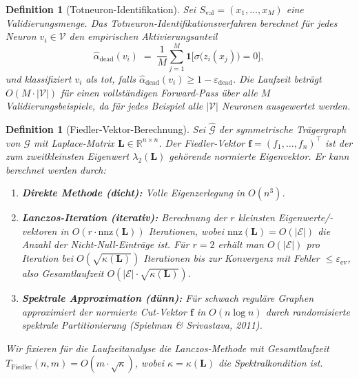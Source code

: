 \documentclass[12pt, a4paper, openany]{report}
\newtheorem{definition}[theorem]{Definition}
\newcommand{\R}{\mathbb{R}}
\newcommand{\calG}{\mathcal{G}}
\newcommand{\calV}{\mathcal{V}}
\newcommand{\calE}{\mathcal{E}}
\newcommand{\eps}{\varepsilon}
\begin{document}
\begin{definition}[Totneuron-Identifikation]
\label{def:dead_identification}
Sei $S_{\mathrm{val}} = (x_1, \ldots, x_M)$ eine Validierungsmenge.
Das \emph{Totneuron-Identifikationsverfahren} berechnet für jedes Neuron
$v_i \in \calV$ den empirischen Aktivierungsanteil
\begin{equation}
  \label{eq:dead_rate}
  \hat{\alpha}_{\mathrm{dead}}(v_i)
  \;=\;
  \frac{1}{M}\sum_{j=1}^{M}
  \mathbf{1}\!\bigl[\sigma\bigl(z_i(x_j)\bigr) = 0\bigr],
\end{equation}
und klassifiziert $v_i$ als tot, falls $\hat{\alpha}_{\mathrm{dead}}(v_i) \geq 1 - \eps_{\mathrm{dead}}$.
Die Laufzeit beträgt $O(M \cdot |\calV|)$ für einen vollständigen Forward-Pass
über alle $M$ Validierungsbeispiele, da für jedes Beispiel alle $|\calV|$ Neuronen
ausgewertet werden.
\end{definition}

\begin{definition}[Fiedler-Vektor-Berechnung]
\label{def:fiedler_computation}
Sei $\hat{\calG}$ der symmetrische Trägergraph von $\calG$ mit
Laplace-Matrix $\bm{L} \in \R^{n \times n}$.  Der
\emph{Fiedler-Vektor} $\bm{f} = (f_1, \ldots, f_n)^\top$ ist der zum
zweitkleinsten Eigenwert $\lambda_2(\bm{L})$ gehörende normierte Eigenvektor.
Er kann berechnet werden durch:
\begin{enumerate}[label=(\roman*)]
  \item \textbf{Direkte Methode (dicht):} Volle Eigenzerlegung in $O(n^3)$.
  \item \textbf{Lanczos-Iteration (iterativ):} Berechnung der $r$ kleinsten
        Eigenwerte/-vektoren in $O(r \cdot \mathrm{nnz}(\bm{L}))$
        Iterationen, wobei $\mathrm{nnz}(\bm{L}) = O(|\calE|)$ die Anzahl
        der Nicht-Null-Einträge ist.  Für $r = 2$ erhält man
        $O(|\calE|)$ pro Iteration bei $O(\sqrt{\kappa(\bm{L})})$
        Iterationen bis zur Konvergenz mit Fehler $\leq \eps_{\mathrm{ev}}$, also
        Gesamtlaufzeit $O(|\calE| \cdot \sqrt{\kappa(\bm{L})})$.
  \item \textbf{Spektrale Approximation (dünn):} Für schwach reguläre
        Graphen approximiert der normierte Cut-Vektor $\bm{f}$ in
        $O(n \log n)$ durch randomisierte spektrale Partitionierung
        (Spielman \& Srivastava, 2011).
\end{enumerate}
Wir fixieren für die Laufzeitanalyse die Lanczos-Methode mit
Gesamtlaufzeit $T_{\mathrm{Fiedler}}(n, m) = O(m \cdot \sqrt{\kappa})$,
wobei $\kappa = \kappa(\bm{L})$ die Spektralkondition ist.
\end{definition}
\end{document}
